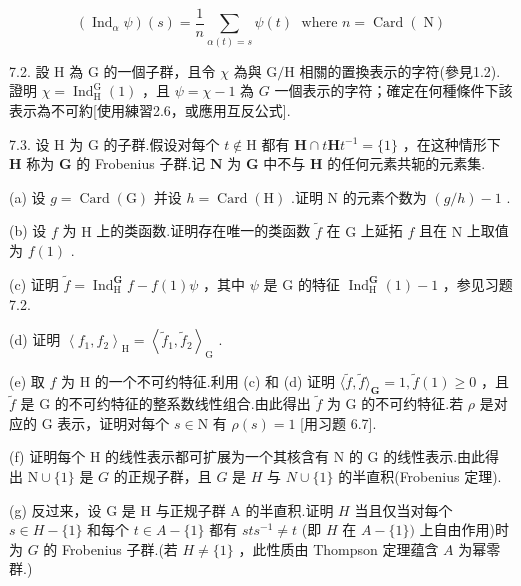 \documentclass[10pt]{article}
\begin{document}
\[
\left( {{\operatorname{Ind}}_{\alpha }\psi }\right) \left( s\right)  = \frac{1}{n}\mathop{\sum }\limits_{{\alpha \left( t\right)  = s}}\psi \left( t\right) \;\text{ where }n = \operatorname{Card}\left( \mathrm{\;N}\right)
\]

7.2. 設 \(\mathrm{H}\) 為 \(\mathrm{G}\) 的一個子群，且令 \(\chi\) 為與 \(\mathrm{G}/\mathrm{H}\) 相關的置換表示的字符(參見1.2).證明 \(\chi  = {\operatorname{Ind}}_{\mathrm{H}}^{\mathrm{G}}\left( 1\right)\) ，且 \(\psi  = \chi  - 1\) 為 \(G\) 一個表示的字符；確定在何種條件下該表示為不可約[使用練習2.6，或應用互反公式].

7.3. 设 \(\mathrm{H}\) 为 \(\mathrm{G}\) 的子群.假设对每个 \(t \notin  \mathrm{H}\) 都有 \(\mathbf{H} \cap  t\mathbf{H}{t}^{-1} = \{ 1\}\) ，在这种情形下 \(\mathbf{H}\) 称为 \(\mathbf{G}\) 的 Frobenius 子群.记 \(\mathbf{N}\) 为 \(\mathbf{G}\) 中不与 \(\mathbf{H}\) 的任何元素共轭的元素集.

(a) 设 \(g = \operatorname{Card}\left( \mathrm{G}\right)\) 并设 \(h = \operatorname{Card}\left( \mathrm{H}\right)\) .证明 \(\mathrm{N}\) 的元素个数为 \(\left( {g/h}\right)  - 1\) .

(b) 设 \(f\) 为 \(\mathrm{H}\) 上的类函数.证明存在唯一的类函数 \(\widetilde{f}\) 在 \(\mathrm{G}\) 上延拓 \(f\) 且在 \(\mathrm{N}\) 上取值为 \(f\left( 1\right)\) .

(c) 证明 \(\widetilde{f} = {\operatorname{Ind}}_{\mathrm{H}}^{\mathbf{G}}f - f\left( 1\right) \psi\) ，其中 \(\psi\) 是 G 的特征 \({\operatorname{Ind}}_{\mathrm{H}}^{\mathbf{G}}\left( 1\right)  - 1\) ，参见习题 7.2.

(d) 证明 \({\left\langle  {f}_{1},{f}_{2}\right\rangle  }_{\mathrm{H}} = {\left\langle  {\widetilde{f}}_{1},{\widetilde{f}}_{2}\right\rangle  }_{\mathrm{G}}\) .

(e) 取 \(f\) 为 H 的一个不可约特征.利用 (c) 和 (d) 证明 \(\langle \widetilde{f},\widetilde{f}{\rangle }_{\mathbf{G}} = 1,\widetilde{f}\left( 1\right)  \geq  0\) ，且 \(\widetilde{f}\) 是 G 的不可约特征的整系数线性组合.由此得出 \(\widetilde{f}\) 为 G 的不可约特征.若 \(\rho\) 是对应的 G 表示，证明对每个 \(s \in  \mathrm{N}\) 有 \(\rho \left( s\right)  = 1\) [用习题 6.7].

(f) 证明每个 \(\mathrm{H}\) 的线性表示都可扩展为一个其核含有 \(\mathrm{N}\) 的 \(\mathrm{G}\) 的线性表示.由此得出 \(\mathrm{N} \cup  \{ 1\}\) 是 \(G\) 的正规子群，且 \(G\) 是 \(H\) 与 \(N \cup  \{ 1\}\) 的半直积(Frobenius 定理).

(g) 反过来，设 G 是 H 与正规子群 A 的半直积.证明 \(H\) 当且仅当对每个 \(s \in  H - \{ 1\}\) 和每个 \(t \in  A - \{ 1\}\) 都有 \({st}{s}^{-1} \neq  t\) (即 \(H\) 在 \(A - \{ 1\} )\) 上自由作用)时为 \(G\) 的 Frobenius 子群.(若 \(H \neq  \{ 1\}\) ，此性质由 Thompson 定理蕴含 \(A\) 为幂零群.)
\end{document}
